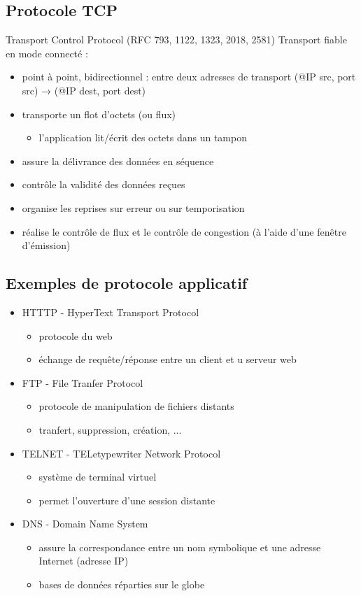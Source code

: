 \documentclass[journal, a4paper]{IEEEtran}
\begin{document}
	\subsection{Protocole TCP}
	Transport Control Protocol (RFC 793, 1122, 1323, 2018, 2581)
	Transport fiable en mode connecté :
	\begin{itemize}
		\item point à point, bidirectionnel : entre deux adresses de transport
(@IP src, port src) → (@IP dest, port dest)
		\item transporte un flot d’octets (ou flux)
		\begin{itemize}
			\item l’application lit/écrit des octets dans un tampon
		\end{itemize}
		\item assure la délivrance des données en séquence
		\item contrôle la validité des données reçues
		\item organise les reprises sur erreur ou sur temporisation
		\item réalise le contrôle de flux et le contrôle de congestion (à l’aide
d’une fenêtre d’émission)
	\end{itemize}
	
	\subsection{Exemples de protocole applicatif}
	\begin{itemize}
		\item HTTTP - HyperText Transport Protocol
		\begin{itemize}
			\item protocole du web
			\item échange de requête/réponse entre un client et u
serveur web
		\end{itemize}
		\item FTP - File Tranfer Protocol
		\begin{itemize}
			\item protocole de manipulation de fichiers distants
			\item tranfert, suppression, création, ...
		\end{itemize}
		\item TELNET - TELetypewriter Network Protocol
		\begin{itemize}
			\item système de terminal virtuel
			\item permet l'ouverture d'une session distante
		\end{itemize}
		\item DNS - Domain Name System
		\begin{itemize}
			\item assure la correspondance entre un nom
symbolique et une adresse Internet (adresse IP)
			\item bases de données réparties sur le globe
		\end{itemize}
	\end{itemize}
	
\end{document}
